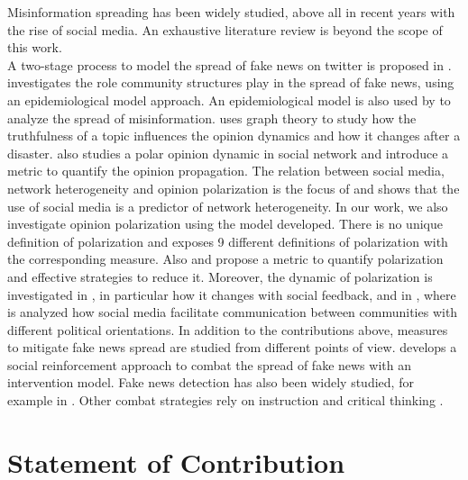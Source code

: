 Misinformation spreading has been widely studied, above all in recent years with the rise of social media. An exhaustive literature review is beyond the scope of this work.\\

A two-stage process to model the spread of fake news on twitter is proposed in \cite{Murayama2021}. \cite{Rath2019} investigates the role community structures play in the spread of fake news, using an epidemiological model approach. An epidemiological model is also used by \cite{Tambuscio2015} to analyze the spread of misinformation. \cite{Hashimoto2021} uses graph theory to study how the truthfulness of a topic influences the opinion dynamics and how it changes after a disaster. \cite{Amelkin2017} also studies a polar opinion dynamic in social network and introduce a metric to quantify the opinion propagation. The relation between social media, network heterogeneity and opinion polarization is the focus of \cite{Lee2014a} and shows that the use of social media is a predictor of network heterogeneity. In our work, we also investigate opinion polarization using the model developed. There is no unique definition of polarization and \cite{Bramsona2016} exposes 9 different definitions of polarization with the corresponding measure. Also \cite{Akoglu2014} and \cite{Matakos2017} propose a metric to quantify polarization and effective strategies to reduce it. Moreover, the dynamic of polarization is investigated in \cite{Banisch2019}, in particular how it changes with social feedback, and in \cite{Conover2011}, where is analyzed how social media facilitate communication between communities with different political orientations. In addition to the contributions above, measures to mitigate fake news spread are studied from different points of view. \cite{mahak2020} develops a social reinforcement approach to combat the spread of fake news with an intervention model. Fake news detection has also been widely studied, for example in \cite{Vijjali2020}\cite{improved}\cite{Zhou2020}\cite{Maryam2019}. Other combat strategies rely on instruction and critical thinking \cite{joanna2017}.


\section{Statement of Contribution}

